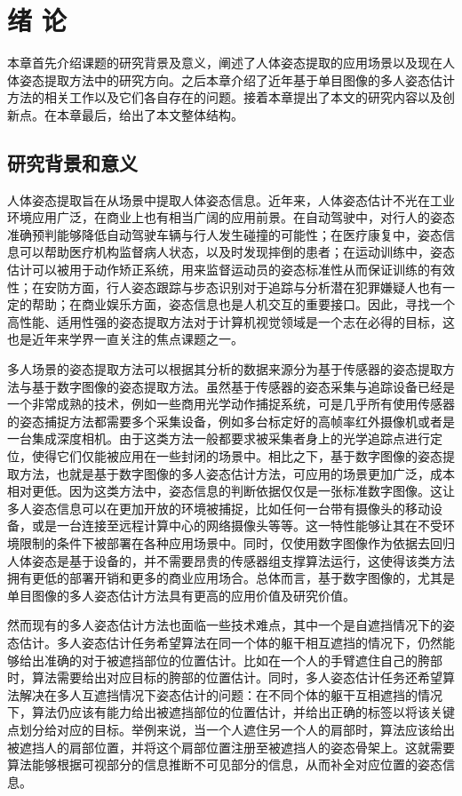 \chapter{绪 论}
\label{cha:intro}

本章首先介绍课题的研究背景及意义，阐述了人体姿态提取的应用场景以及现在人体姿态提取方法中的研究方向。之后本章介绍了近年基于单目图像的多人姿态估计方法的相关工作以及它们各自存在的问题。接着本章提出了本文的研究内容以及创新点。在本章最后，给出了本文整体结构。

\section{研究背景和意义}
\label{sec:generalbackground}
人体姿态提取旨在从场景中提取人体姿态信息。近年来，人体姿态估计不光在工业环境应用广泛，在商业上也有相当广阔的应用前景。在自动驾驶中，对行人的姿态准确预判能够降低自动驾驶车辆与行人发生碰撞的可能性；在医疗康复中，姿态信息可以帮助医疗机构监督病人状态，以及时发现摔倒的患者；在运动训练中，姿态估计可以被用于动作矫正系统，用来监督运动员的姿态标准性从而保证训练的有效性；在安防方面，行人姿态跟踪与步态识别对于追踪与分析潜在犯罪嫌疑人也有一定的帮助；在商业娱乐方面，姿态信息也是人机交互的重要接口。因此，寻找一个高性能、适用性强的姿态提取方法对于计算机视觉领域是一个志在必得的目标，这也是近年来学界一直关注的焦点课题之一。

多人场景的姿态提取方法可以根据其分析的数据来源分为基于传感器的姿态提取方法与基于数字图像的姿态提取方法。虽然基于传感器的姿态采集与追踪设备已经是一个非常成熟的技术，例如一些商用光学动作捕捉系统，可是几乎所有使用传感器的姿态捕捉方法都需要多个采集设备，例如多台标定好的高帧率红外摄像机或者是一台集成深度相机。由于这类方法一般都要求被采集者身上的光学追踪点进行定位，使得它们仅能被应用在一些封闭的场景中。相比之下，基于数字图像的姿态提取方法，也就是基于数字图像的多人姿态估计方法，可应用的场景更加广泛，成本相对更低。因为这类方法中，姿态信息的判断依据仅仅是一张标准数字图像。这让多人姿态信息可以在更加开放的环境被捕捉，比如任何一台带有摄像头的移动设备，或是一台连接至远程计算中心的网络摄像头等等。这一特性能够让其在不受环境限制的条件下被部署在各种应用场景中。同时，仅使用数字图像作为依据去回归人体姿态是基于设备的，并不需要昂贵的传感器组支撑算法运行，这使得该类方法拥有更低的部署开销和更多的商业应用场合。总体而言，基于数字图像的，尤其是单目图像的多人姿态估计方法具有更高的应用价值及研究价值。

然而现有的多人姿态估计方法也面临一些技术难点，其中一个是自遮挡情况下的姿态估计。多人姿态估计任务希望算法在同一个体的躯干相互遮挡的情况下，仍然能够给出准确的对于被遮挡部位的位置估计。比如在一个人的手臂遮住自己的胯部时，算法需要给出对应目标的胯部的位置估计。同时，多人姿态估计任务还希望算法解决在多人互遮挡情况下姿态估计的问题：在不同个体的躯干互相遮挡的情况下，算法仍应该有能力给出被遮挡部位的位置估计，并给出正确的标签以将该关键点划分给对应的目标。举例来说，当一个人遮住另一个人的肩部时，算法应该给出被遮挡人的肩部位置，并将这个肩部位置注册至被遮挡人的姿态骨架上。这就需要算法能够根据可视部分的信息推断不可见部分的信息，从而补全对应位置的姿态信息。

